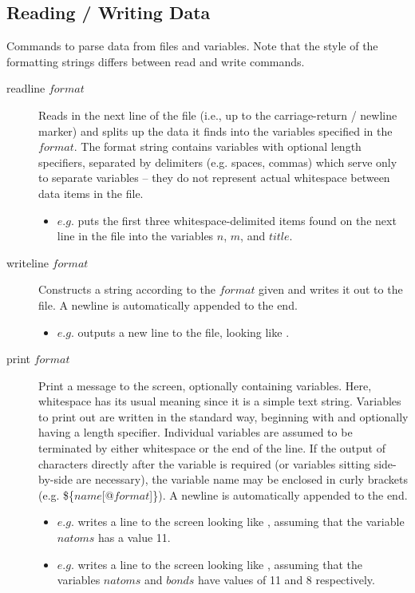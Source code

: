 \subsection{Reading / Writing Data}
Commands to parse data from files and variables. Note that the style of the formatting strings differs between read and write commands.\\
\begin{description}

	\item[readline $format$\its]
	Reads in the next line of the file (i.e., up to the carriage-return / newline marker) and splits up the data it finds into the variables specified in the $format$. The format string contains variables with optional length specifiers, separated by delimiters (e.g. spaces, commas) which serve only to separate variables -- they do not represent actual whitespace between data items in the file.
	\begin{itemize}
		\item $e.g.$  puts the first three whitespace-delimited items found on the next line in the file into the variables $n$, $m$, and $title$.
	\end{itemize}

	\item[writeline $format$\its]
	Constructs a string according to the $format$ given and writes it out to the file. A newline is automatically appended to the end.
	\begin{itemize}
		\item $e.g.$  outputs a new line to the file, looking like .
	\end{itemize}

	\item[print $format$\its]
	Print a message to the screen, optionally containing variables. Here, whitespace has its usual meaning since it is a simple text string. Variables to print out are written in the standard way, beginning with \qte{\$} and optionally having a length specifier. Individual variables are assumed to be terminated by either whitespace or the end of the line. If the output of characters directly after the variable is required (or variables sitting side-by-side are necessary), the variable name may be enclosed in curly brackets (e.g. \$\{$name$[@$format$]\}). A newline is automatically appended to the end.
	\begin{itemize}
		\item $e.g.$  writes a line to the screen looking like , assuming that the variable $natoms$ has a value 11.
		\item $e.g.$  writes a line to the screen looking like , assuming that the variables $natoms$ and $bonds$ have values of 11 and 8 respectively.
	\end{itemize}

\end{description}


